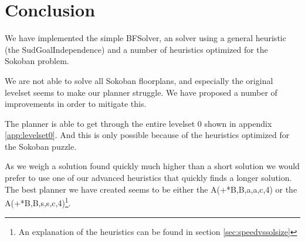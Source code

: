 \chapter{Conclusion}
\label{cha:conclusion}

We have implemented the simple BFSolver, an \astar solver using a general heuristic (the SudGoalIndependence) and a number of heuristics optimized for the Sokoban problem.

We are not able to solve all Sokoban floorplans, and especially the original levelset seems to make our planner struggle. We have proposed a number of improvements in order to mitigate this.

The planner is able to get through the entire levelset 0 shown in appendix \ref{app:levelset0}. And this is only possible because of the heuristics optimized for the Sokoban puzzle.

As we weigh a solution found quickly much higher than a short solution we would prefer to use one of our advanced heuristics that quickly finds a longer solution.
The best planner we have created seems to be either the A(+{*{B,B,a,a},c,4}) or the A(+{*{B,B,s,s},c,4})\footnote{An explanation of the heuristics can be found in section \ref{sec:speedvssolsize}}.
